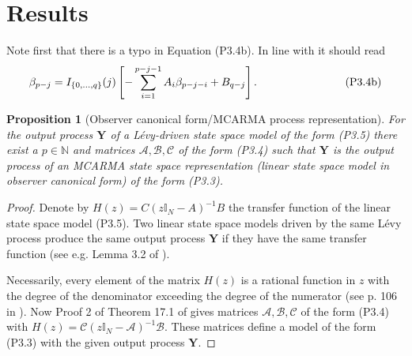\documentclass[preprint,a4paper,authoryear]{imsart}
\numberwithin{equation}{section}
\theoremstyle{plain}
\newtheorem{proposition}[theorem]{Proposition}
\theoremstyle{definition}
\theoremstyle{remark}
\begin{document}
\section{Results}
Note first that there is a typo in Equation (P3.4b). In line with  \cite[Theorem 3.12]{marquardt2007multivariate}  it should read
\[
\beta_{p-j} = I_{\{0,\ldots,q\}}(j)\left[-\sum_{i=1}^{p-j-1}{A_i\beta_{p-j-i}+B_{q-j}}\right].\qquad\qquad\qquad\qquad\hfill \mathrm{(P3.4b)}
\]
\begin{proposition}[Observer canonical form/MCARMA process representation]\label{prop:observer}
	For the output process $\mathbf{Y}$ of a L\'evy-driven state space model of the form (P3.5) there exist a $p\in\mathbb{N}$ and matrices $\mathcal{A,B,C}$ of the form (P3.4) such that $\mathbf{Y}$  is the output process of an MCARMA state space representation (linear state space model in observer canonical form) of the form (P3.3).
\end{proposition}
\begin{proof}
	Denote by $H(z)=C(z\mathbb{I}_N-A)^{-1} B$ the transfer function of the linear state space model (P3.5). Two linear state space models driven by the same L\'evy process produce the same output process $\mathbf{Y}$ if they have the same transfer function (see e.g. Lemma 3.2 of \cite{SchlemmStelzer2012EJS}). 
	
	Necessarily, every element of the matrix $H(z)$  is a rational function in $z$ with the degree of the denominator exceeding the degree of the numerator (see p. 106 in \cite{Brockett2015}). Now Proof 2 of Theorem 17.1 of \cite{Brockett2015} gives matrices $\mathcal{A,B,C}$ of the form (P3.4) with $H(z)=\mathcal{C}(z\mathbb{I}_N-\mathcal{A})^{-1} \mathcal{B}$. These matrices define a model of the  form (P3.3) with the given output process $\mathbf Y$.
	
\end{proof}
\end{document}
